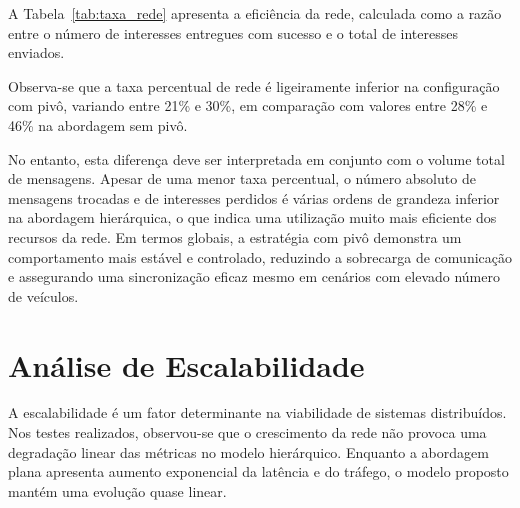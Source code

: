 A Tabela~\ref{tab:taxa_rede} apresenta a eficiência da rede, calculada como a razão entre o número de interesses entregues com sucesso e o total de interesses enviados. 
\begin{table}[H]
\centering
\caption{Taxa da rede (eficiência de entrega de interesses) com e sem pivô.}
\label{tab:taxa_rede}
\end{table}

Observa-se que a taxa percentual de rede é ligeiramente inferior na configuração com pivô, variando entre 21\% e 30\%, em comparação com valores entre 28\% e 46\% na abordagem sem pivô. 

No entanto, esta diferença deve ser interpretada em conjunto com o volume total de mensagens. 
Apesar de uma menor taxa percentual, o número absoluto de mensagens trocadas e de interesses perdidos é várias ordens de grandeza inferior na abordagem hierárquica, o que indica uma utilização muito mais eficiente dos recursos da rede. 
Em termos globais, a estratégia com pivô demonstra um comportamento mais estável e controlado, reduzindo a sobrecarga de comunicação e assegurando uma sincronização eficaz mesmo em cenários com elevado número de veículos.



\section{Análise de Escalabilidade}

A escalabilidade é um fator determinante na viabilidade de sistemas distribuídos.  
Nos testes realizados, observou-se que o crescimento da rede não provoca uma degradação linear das métricas no modelo hierárquico.  
Enquanto a abordagem plana apresenta aumento exponencial da latência e do tráfego, o modelo proposto mantém uma evolução quase linear.

